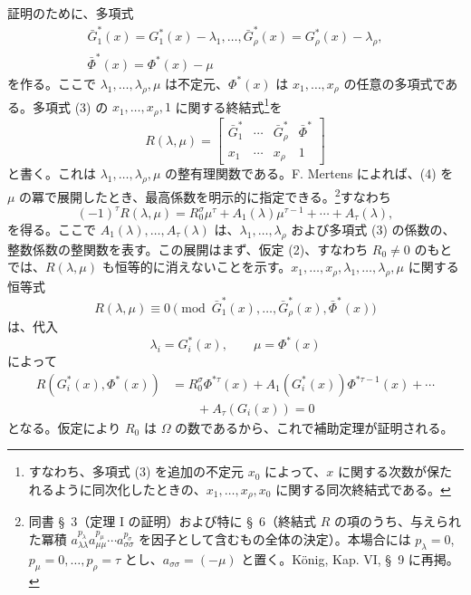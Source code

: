 \documentclass[11pt]{article}
\begin{document}
証明のために、多項式
\begin{equation}
\begin{gathered}
  \bar G_1^*(x)=G_1^*(x)-\lambda_1,
  \ldots,
  \bar G_\rho^*(x)=G_\rho^*(x)-\lambda_\rho,\\
  \bar\Phi^*(x)=\Phi^*(x)-\mu
\end{gathered}
\tag{3}
\end{equation}
を作る。ここで $\lambda_1,\ldots,\lambda_\rho,\mu$ は不定元、$\Phi^*(x)$ は $x_1,\ldots,x_\rho$ の任意の多項式である。多項式 (3) の $x_1,\ldots,x_\rho,1$ に関する終結式\footnote{すなわち、多項式 (3) を追加の不定元 $x_0$ によって、$x$ に関する次数が保たれるように同次化したときの、$x_1,\ldots,x_\rho,x_0$ に関する同次終結式である。}を
\begin{equation}
  R(\lambda,\mu)=\left[
  \begin{array}{cccc}
   \bar G_1^*&\cdots&\bar G_\rho^*&\bar\Phi^*\\
   x_1&\cdots&x_\rho&1
  \end{array}
  \right]
\tag{4}
\end{equation}
と書く。これは $\lambda_1,\ldots,\lambda_\rho,\mu$ の整有理関数である。F. Mertens によれば、(4) を $\mu$ の冪で展開したとき、最高係数を明示的に指定できる。\footnote{同書 \S\ 3（定理 I の証明）および特に \S\ 6（終結式 $R$ の項のうち、与えられた冪積 $a_{\lambda\lambda}^{p_\lambda}a_{\mu\mu}^{p_\mu}\cdots a_{\sigma\sigma}^{p_\sigma}$ を因子として含むもの全体の決定）。本場合には $p_\lambda=0$, $p_\mu=0,\ldots,p_\rho=\tau$ とし、$a_{\sigma\sigma}=(-\mu)$ と置く。König, Kap. VI, \S\ 9 に再掲。}すなわち
\begin{equation}
  (-1)^\tau R(\lambda,\mu)
  =R_0^\sigma\mu^\tau+A_1(\lambda)\mu^{\tau-1}+\cdots+A_\tau(\lambda),
\tag{5}
\end{equation}
を得る。ここで $A_1(\lambda),\ldots,A_\tau(\lambda)$ は、$\lambda_1,\ldots,\lambda_\rho$ および多項式 (3) の係数の、整数係数の整関数を表す。この展開はまず、仮定 (2)、すなわち $R_0\ne0$ のもとでは、$R(\lambda,\mu)$ も恒等的に消えないことを示す。$x_1,\ldots,x_\rho,\lambda_1,\ldots,\lambda_\rho,\mu$ に関する恒等式
\[
  R(\lambda,
\mu)\equiv 0\pmod{\bar G_1^*(x),\ldots,
\bar G_\rho^*(x),\bar\Phi^*(x)}
\]
は、代入
\[
  \lambda_i=G_i^*(x),\qquad \mu=\Phi^*(x)
\]
によって
\begin{equation}
\begin{aligned}
  R(G_i^*(x),\Phi^*(x))
  &=R_0^\sigma\Phi^{*\tau}(x)
    +A_1(G_i^*(x))\Phi^{*\tau-1}(x)+\cdots \\
  &\qquad +A_\tau(G_i(x))=0
\end{aligned}
\tag{6}
\end{equation}
となる。仮定により $R_0$ は $\Omega$ の数であるから、これで補助定理が証明される。
\end{document}
